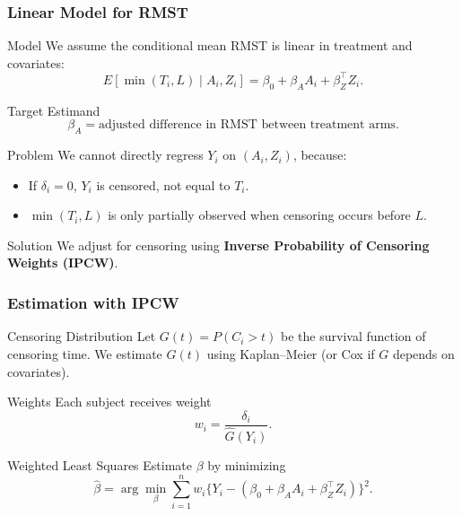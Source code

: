 \documentclass{beamer}
\begin{document}
\begin{frame}
\frametitle{Linear Model for RMST}

\begin{block}{Model}
We assume the conditional mean RMST is linear in treatment and covariates:
\[
E[\min(T_i,L) \mid A_i, Z_i] = \beta_0 + \beta_A A_i + \beta_Z^\top Z_i.
\]
\end{block}

\begin{block}{Target Estimand}
\[
\beta_A = \text{adjusted difference in RMST between treatment arms}.
\]
\end{block}


\begin{block}{Problem}
We cannot directly regress $Y_i$ on $(A_i,Z_i)$, because:
\begin{itemize}
  \item If $\delta_i=0$, $Y_i$ is censored, not equal to $T_i$.
  \item $\min(T_i,L)$ is only partially observed when censoring occurs before $L$.
\end{itemize}
\end{block}

\begin{block}{Solution}
We adjust for censoring using \textbf{Inverse Probability of Censoring Weights (IPCW)}.
\end{block}

\end{frame}

\begin{frame}
\frametitle{Estimation with IPCW}

\begin{block}{Censoring Distribution}
Let $G(t) = P(C_i > t)$ be the survival function of censoring time.  
We estimate $\widehat{G}(t)$ using Kaplan–Meier (or Cox if $G$ depends on covariates).
\end{block}

\begin{block}{Weights}
Each subject receives weight
\[
w_i = \frac{\delta_i}{\widehat{G}(Y_i)}.
\]
\end{block}

\begin{block}{Weighted Least Squares}
Estimate $\beta$ by minimizing
\[
\widehat{\beta} = \arg\min_\beta \sum_{i=1}^n w_i \Big\{ Y_i - (\beta_0 + \beta_A A_i + \beta_Z^\top Z_i)\Big\}^2.
\]
\end{block}

\end{frame}
\end{document}
